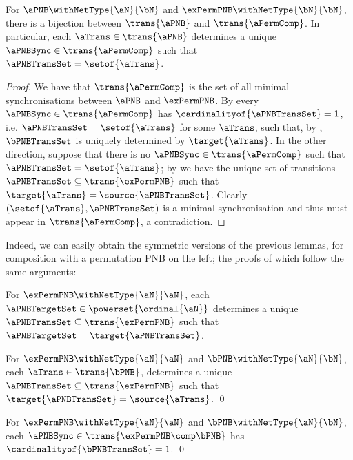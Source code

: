 \begin{lemma} \label{lem:singletonInCompWithPerPNB}
    For $\aPNB \withNetType{\aN}{\bN}$ and $\exPermPNB \withNetType{\bN}{\bN}$,
    there is a bijection between $\trans{\aPNB}$ and $\trans{\aPermComp}$. In
    particular, each $\aTrans \in \trans{\aPNB}$ determines a unique
    $\aPNBSync \in \trans{\aPermComp}$ such that $\aPNBTransSet =
    \setof{\aTrans}$.
\end{lemma}
\begin{proof}
    We have that $\trans{\aPermComp}$ is the set of all minimal
    synchronisations between $\aPNB$ and $\exPermPNB$. By
     every $\aPNBSync \in \trans{\aPermComp}$
    has $\cardinalityof{\aPNBTransSet} = 1$, i.e. $\aPNBTransSet = \setof{\aTrans}$ for some
    $\aTrans$, such that,
    by , $\bPNBTransSet$ is uniquely
    determined by $\target{\aTrans}$. In the other direction, suppose that there is no $\aPNBSync
    \in \trans{\aPermComp}$ such that $\aPNBTransSet = \setof{\aTrans}$; by
     we have the unique set of transitions $\aPNBTransSet \subseteq
    \trans{\exPermPNB}$ such that $\target{\aTrans} = \source{\aPNBTransSet}$. Clearly
    $(\setof{\aTrans}, \aPNBTransSet)$ is a minimal synchronisation and thus must appear in
    $\trans{\aPermComp}$, a contradiction.
\end{proof}

Indeed, we can easily obtain the symmetric versions of the previous lemmas, for composition with a
permutation PNB on the left; the proofs of which follow the same arguments:

\begin{lemma} \label{lem:uniqueTransSyncSym}
    For $\exPermPNB \withNetType{\aN}{\aN}$, each $\aPNBTargetSet \in \powerset{\ordinal{\aN}}$
     determines a unique $\aPNBTransSet \subseteq \trans{\exPermPNB}$ such that $\aPNBTargetSet =
    \target{\aPNBTransSet}$.

    For $\exPermPNB \withNetType{\aN}{\aN}$ and $\bPNB \withNetType{\aN}{\bN}$, each
    $\aTrans \in \trans{\bPNB}$, determines a unique $\aPNBTransSet
    \subseteq \trans{\exPermPNB}$ such that $\target{\aPNBTransSet} =
    \source{\aTrans}$.
    \qed
\end{lemma}

\begin{lemma} \label{lem:singletonSynchSym}
    For $\exPermPNB \withNetType{\aN}{\aN}$ and $\bPNB \withNetType{\aN}{\bN}$, each
    $\aPNBSync \in \trans{\exPermPNB \comp \bPNB}$ has
    $\cardinalityof{\bPNBTransSet} = 1$.  \qed
\end{lemma}


